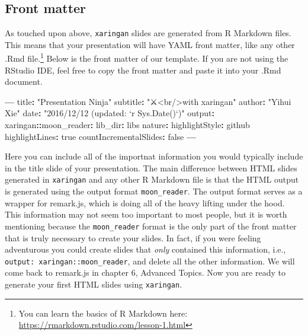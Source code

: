 \documentclass[
]{book}
\newenvironment{Shaded}{\begin{snugshade}}{\end{snugshade}}
\newcommand{\NormalTok}[1]{#1}
\newcommand{\OperatorTok}[1]{\textcolor[rgb]{0.43,0.43,0.43}{\textbf{#1}}}
\newcommand{\StringTok}[1]{\textcolor[rgb]{0.5,0.5,0.5}{#1}}
\begin{document}
\hypertarget{front-matter}{%
\subsection{Front matter}\label{front-matter}}

As touched upon above, \texttt{xaringan} slides are generated from R Markdown files. This means that your presentation will have YAML front matter, like any other .Rmd file.\footnote{You can learn the basics of R Markdown here: \url{https://rmarkdown.rstudio.com/lesson-1.html}} Below is the front matter of our template. If you are not using the RStudio IDE, feel free to copy the front matter and paste it into your .Rmd document.

\begin{Shaded}
\begin{Highlighting}[]
\OperatorTok{---}
\NormalTok{title}\OperatorTok{:}\StringTok{ "Presentation Ninja"}
\NormalTok{subtitle}\OperatorTok{:}\StringTok{ "⚔<br/>with xaringan"}
\NormalTok{author}\OperatorTok{:}\StringTok{ "Yihui Xie"}
\NormalTok{date}\OperatorTok{:}\StringTok{ "2016/12/12 (updated: `r Sys.Date()`)"}
\NormalTok{output}\OperatorTok{:}
\StringTok{  }\NormalTok{xaringan}\OperatorTok{::}\NormalTok{moon_reader}\OperatorTok{:}
\StringTok{    }\NormalTok{lib_dir}\OperatorTok{:}\StringTok{ }\NormalTok{libs}
\NormalTok{    nature}\OperatorTok{:}
\StringTok{      }\NormalTok{highlightStyle}\OperatorTok{:}\StringTok{ }\NormalTok{github}
\NormalTok{      highlightLines}\OperatorTok{:}\StringTok{ }\NormalTok{true}
\NormalTok{      countIncrementalSlides}\OperatorTok{:}\StringTok{ }\NormalTok{false}
\OperatorTok{---}
\end{Highlighting}
\end{Shaded}

Here you can include all of the importnat information you would typically include in the title slide of your presentation. The main difference between HTML slides generated in \texttt{xaringan} and any other R Markdown file is that the HTML output is generated using the output format \texttt{moon\_reader}. The output format serves as a wrapper for remark.js, which is doing all of the heavy lifting under the hood. This information may not seem too important to most people, but it is worth mentioning because the \texttt{moon\_reader} format is the only part of the front matter that is truly necessary to create your slides. In fact, if you were feeling adventurous you could create slides that \emph{only} contained this information, i.e., \texttt{output:\ xaringan::moon\_reader}, and delete all the other information. We will come back to remark.js in chapter 6, Advanced Topics. Now you are ready to generate your first HTML slides using \texttt{xaringan}.
\end{document}
